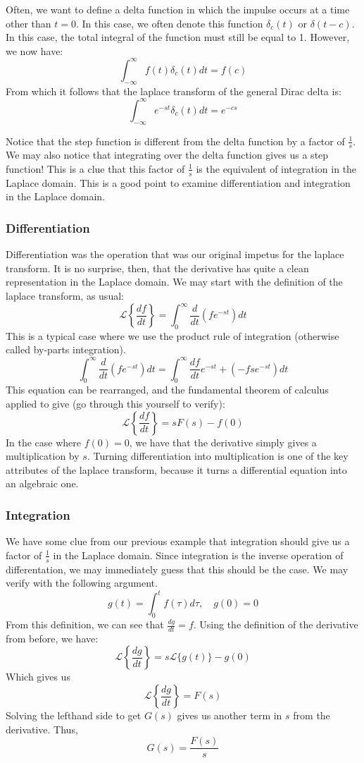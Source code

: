 Often, we want to define a delta function in which the impulse occurs at a time other than $t=0$. In this case, we often denote this function $\delta_c(t)$ or $\delta(t-c)$. In this case, the total integral of the function must still be equal to 1. However, we now have:
$$\int_{-\infty}^{\infty}f(t)\delta_c(t)dt=f(c)$$
From which it follows that the \gls{laplace transform} of the general Dirac delta is:
$$\int_{-\infty}^{\infty}e^{-st}\delta_c(t)dt=e^{-cs}$$

Notice that the step function is different from the delta function by a factor of $\frac{1}{s}$. We may also notice that integrating over the delta function gives us a step function! This is a clue that this factor of $\frac{1}{s}$ is the equivalent of integration in the Laplace domain. This is a good point to examine differentiation and integration in the Laplace domain.
\subsubsection{Differentiation}
Differentiation was the operation that was our original impetus for the \gls{laplace transform}. It is no surprise, then, that the derivative has quite a clean representation in the Laplace domain. We may start with the definition of the \gls{laplace transform}, as usual:
$$\mathscr{L}\left\{\frac{df}{dt}\right\}=\int_0^\infty{\frac{d}{dt}(fe^{-st})dt}$$
This is a typical case where we use the product rule of integration (otherwise called by-parts integration).
$$\int_0^\infty{\frac{d}{dt}(fe^{-st})dt}=\int_0^\infty\frac{df}{dt}e^{-st}+(-fse^{-st})dt$$
This equation can be rearranged, and the fundamental theorem of calculus applied to give (go through this yourself to verify):
$$\mathscr{L}\left\{\frac{df}{dt}\right\}=sF(s)-f(0)$$
In the case where $f(0)=0$, we have that the derivative simply gives a multiplication by $s$. Turning differentiation into multiplication is one of the key attributes of the \gls{laplace transform}, because it turns a differential equation into an algebraic one.

\subsubsection{Integration}
We have some clue from our previous example that integration should give us a factor of $\frac{1}{s}$ in the Laplace domain. Since integration is the inverse operation of differentation, we may immediately guess that this should be the case. We may verify with the following argument.
$$g(t)=\int_0^tf(\tau)d\tau,\quad g(0)=0$$
From this definition, we can see that $\frac{dg}{dt}=f$. Using the definition of the derivative from before, we have:
$$\mathscr{L}\left\{\frac{dg}{dt}\right\}=s\mathscr{L}\{g(t)\}-g(0)$$
Which gives us 
$$\mathscr{L}\left\{\frac{dg}{dt}\right\}=F(s)$$
Solving the lefthand side to get $G(s)$ gives us another term in $s$ from the derivative. Thus,
$$G(s)=\frac{F(s)}{s}$$

